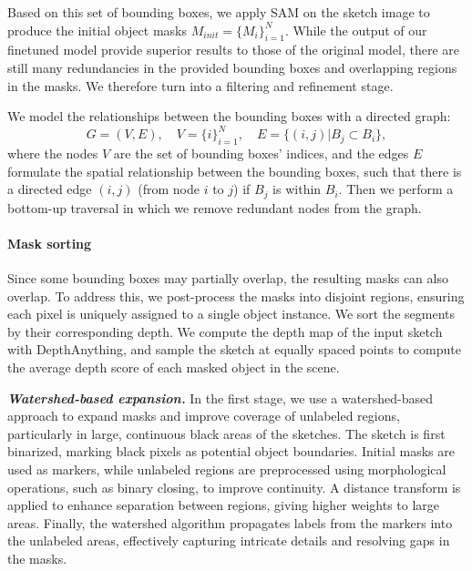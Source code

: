 Based on this set of bounding boxes, we apply SAM on the sketch image to produce the initial object masks $M_{init} = \{M_i\}_{i=1}^N$.
While the output of our finetuned model provide superior results to those of the original model, there are still many redundancies in the provided bounding boxes and overlapping regions in the masks.
We therefore turn into a filtering and refinement stage.

We model the relationships between the bounding boxes with a directed graph:
\begin{equation}
    G=(V, E), \quad V = \{i\}_{i=1}^N, \quad E=\{(i,j) | B_j \subset B_i\},
\end{equation}
where the nodes $V$ are the set of bounding boxes' indices, and the edges $E$ formulate the spatial relationship between the bounding boxes, such that there is a directed edge $(i,j)$ (from node $i$ to $j$) if $B_j$ is within $B_i$.
Then we perform a bottom-up traversal in which we remove redundant nodes from the graph. 



\paragraph{Mask sorting}
Since some bounding boxes may partially overlap, the resulting masks can also overlap. To address this, we post-process the masks into disjoint regions, ensuring each pixel is uniquely assigned to a single object instance.
We sort the segments by their corresponding depth. We compute the depth map of the input sketch with DepthAnything, and sample the sketch at equally spaced points to compute the average depth score of each masked object in the scene.

\textbf{\textit{Watershed-based expansion. }}In the first stage, we use a watershed-based approach to expand masks and improve coverage of unlabeled regions, particularly in large, continuous black areas of the sketches. The sketch is first binarized, marking black pixels as potential object boundaries. Initial masks are used as markers, while unlabeled regions are preprocessed using morphological operations, such as binary closing, to improve continuity. A distance transform is applied to enhance separation between regions, giving higher weights to large areas. Finally, the watershed algorithm propagates labels from the markers into the unlabeled areas, effectively capturing intricate details and resolving gaps in the masks.


